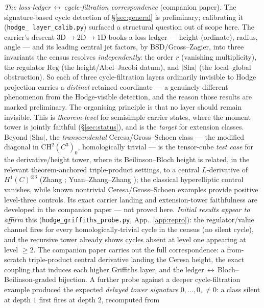 \documentclass[11pt]{article}
\theoremstyle{definition}
\newcommand{\Sha}{\mathrm{Sha}}
\begin{document}
\emph{The loss-ledger$\,\leftrightarrow\,$cycle-filtration correspondence} (companion paper). The
signature-based cycle detection of \S\ref{sec:general} is preliminary; calibrating it (\texttt{hodge\_%
layer\_calib.py}) surfaced a structural question out of scope here. The carrier's descent
$3\mathrm D\!\to\!2\mathrm D\!\to\!1\mathrm D$ books a loss ledger --- height (ordinate), radius, angle ---
and its leading central jet factors, by BSD/Gross--Zagier, into three invariants the census resolves
\emph{independently}: the order $r$ (vanishing multiplicity), the regulator $\mathrm{Reg}$ (the
height/Abel--Jacobi datum), and $|\Sha|$ (the local--global obstruction). So each of three
cycle-filtration layers ordinarily invisible to Hodge projection carries a \emph{distinct} retained
coordinate --- a genuinely different phenomenon from the Hodge-visible detection, and the reason those
results are marked preliminary. The organising principle is that no layer should remain
invisible. This is \emph{theorem-level} for semisimple carrier states, where the moment tower is jointly
faithful (\S\ref{sec:status}), and is the \emph{target} for extension classes. Beyond $|\Sha|$, the
\emph{transcendental} Ceresa/Gross--Schoen class --- the modified diagonal in $\mathrm{CH}^2(C^3)_0$,
homologically trivial --- is the tensor-cube \emph{test case} for the derivative/height tower, where its
Beilinson--Bloch height is related, in the relevant theorem-anchored triple-product settings, to a central
$L$-derivative of $H^1(C)^{\otimes3}$ (Zhang \cite{ZhangGS}; Yuan--Zhang--Zhang \cite{YZZ}); the classical
hyperelliptic control vanishes, while known nontrivial Ceresa/Gross--Schoen examples provide positive
level-three controls. Its exact carrier landing and extension-tower faithfulness are developed in the
companion paper --- not proved here. \emph{Initial results appear to affirm} this
(\texttt{hodge\_griffiths\_probe.py}, App.~\ref{app:repro}): the regulator/value channel fires for every
homologically-trivial cycle in the census (no silent cycle), and the recursive tower already shows cycles
absent at level one appearing at level $\ge2$. The companion paper carries out the full correspondence: a
from-scratch triple-product central derivative landing the Ceresa height, the exact coupling that induces
each higher Griffiths layer, and the ledger$\,\leftrightarrow\,$Bloch--Beilinson-graded bijection. A
further probe against a deeper cycle-filtration example produced the expected \emph{delayed tower
signature} $0,\dots,0,\neq0$: a class silent at depth $1$ first fires at depth $2$, recomputed from
\end{document}
